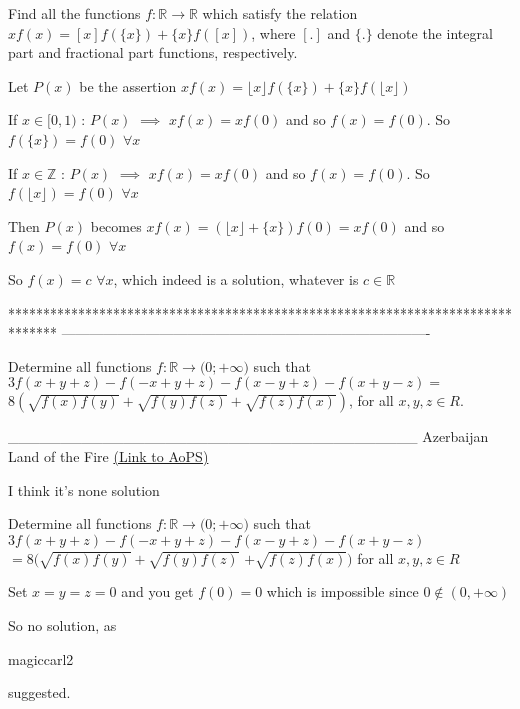 \begin{solution}
	\begin{tcolorbox}Find all the functions $f: \mathbb{R}\to\mathbb{R}$ which satisfy the relation $xf(x)=[ x ]f(\{ x \})+\{ x \}f([ x])$, where $[ . ]$ and $\{ . \}$ denote the integral part and fractional part functions, respectively.\end{tcolorbox}
Let $P(x)$ be the assertion $xf(x)=\lfloor x\rfloor f(\{x\})+\{x\}f(\lfloor x\rfloor)$

If $x\in[0,1)$ : $P(x)$ $\implies$ $xf(x)=xf(0)$ and so $f(x)=f(0)$. So $f(\{x\})=f(0)$ $\forall x$

If $x\in\mathbb Z$ : $P(x)$ $\implies$ $xf(x)=xf(0)$ and so $f(x)=f(0)$. So $f(\lfloor x\rfloor)=f(0)$ $\forall x$

Then $P(x)$ becomes $xf(x)=(\lfloor x\rfloor+\{x\})f(0)=xf(0)$ and so $f(x)=f(0)$ $\forall x$

So $\boxed{f(x)=c}$ $\forall x$, which indeed is a solution, whatever is $c\in\mathbb R$
\end{solution}
*******************************************************************************
-------------------------------------------------------------------------------

\begin{problem}
	Determine all functions  ${f: \mathbb{R}\to\mathbb(0; +\infty)}$  such that 
$3f(x+y+z)-f(-x+y+z)-f(x-y+z)-f(x+y-z)=$ $8(\sqrt{f(x)f(y)}+\sqrt{f(y)f(z)}+\sqrt{f(z)f(x)})$,  for all $x,y,z{\in}R$.


_______________________________________
Azerbaijan Land of the Fire 
	\flushright \href{https://artofproblemsolving.com/community/c6h536452}{(Link to AoPS)}
\end{problem}



\begin{solution}
	I think it's none solution
\end{solution}



\begin{solution}
	\begin{tcolorbox}Determine all functions  ${f: \mathbb{R}\to\mathbb(0; +\infty)}$  such that 
$3f(x+y+z)-f(-x+y+z)-f(x-y+z)-f(x+y-z)$ $=8(\sqrt{f(x)f(y)}+\sqrt{f(y)f(z)}$ $+\sqrt{f(z)f(x)})$  for all $x,y,z{\in}R$\end{tcolorbox}
Set $x=y=z=0$ and you get $f(0)=0$ which is impossible since $0\notin(0,+\infty)$

So no solution, as \begin{bolded}magiccarl2 \end{bolded}suggested.
\end{solution}



